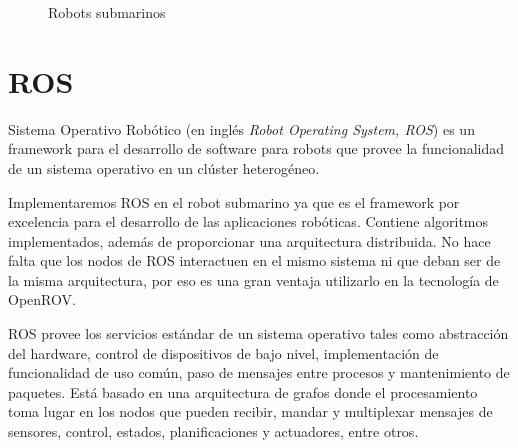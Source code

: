 \begin{figure}[hbtp]
  \begin{center}
  \end{center}
  \caption{Robots submarinos}
  \label{fig:submarino}
\end{figure}
  
\section{ROS}
\label{cap:ROS}

Sistema Operativo Robótico (en inglés \textit{Robot Operating System, ROS}\cite{ros}) es un framework para el desarrollo de software para robots que provee la funcionalidad de un sistema operativo en un clúster heterogéneo. 

Implementaremos ROS en el robot submarino ya que es el framework por excelencia para el desarrollo de las aplicaciones robóticas. Contiene algoritmos implementados, además de proporcionar una arquitectura distribuida. No hace falta que los nodos de ROS interactuen en el mismo sistema ni que deban ser de la misma arquitectura, por eso es una gran ventaja utilizarlo en la tecnología de OpenROV. 

ROS provee los servicios estándar de un sistema operativo tales como abstracción del hardware, control de dispositivos de bajo nivel, implementación de funcionalidad de uso común, paso de mensajes entre procesos y mantenimiento de paquetes. Está basado en una arquitectura de grafos donde el procesamiento toma lugar en los nodos que pueden recibir, mandar y multiplexar mensajes de sensores, control, estados, planificaciones y actuadores, entre otros.

